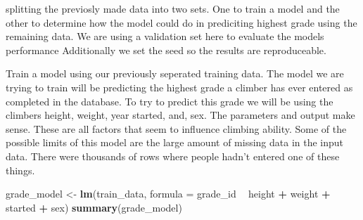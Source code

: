 \documentclass[]{article}
\newenvironment{Shaded}{\begin{snugshade}}{\end{snugshade}}
\newcommand{\CommentTok}[1]{\textcolor[rgb]{0.56,0.35,0.01}{\textit{#1}}}
\newcommand{\DataTypeTok}[1]{\textcolor[rgb]{0.13,0.29,0.53}{#1}}
\newcommand{\DecValTok}[1]{\textcolor[rgb]{0.00,0.00,0.81}{#1}}
\newcommand{\KeywordTok}[1]{\textcolor[rgb]{0.13,0.29,0.53}{\textbf{#1}}}
\newcommand{\NormalTok}[1]{#1}
\newcommand{\OperatorTok}[1]{\textcolor[rgb]{0.81,0.36,0.00}{\textbf{#1}}}
\newcommand{\StringTok}[1]{\textcolor[rgb]{0.31,0.60,0.02}{#1}}
\begin{document}
splitting the previosly made data into two sets. One to train a model
and the other to determine how the model could do in prediciting highest
grade using the remaining data. We are using a validation set here to
evaluate the models performance Additionally we set the seed so the
results are reproduceable.

\begin{Shaded}
\end{Shaded}

Train a model using our previously seperated training data. The model we
are trying to train will be predicting the highest grade a climber has
ever entered as completed in the database. To try to predict this grade
we will be using the climbers height, weight, year started, and, sex.
The parameters and output make sense. These are all factors that seem to
influence climbing ability. Some of the possible limits of this model
are the large amount of missing data in the input data. There were
thousands of rows where people hadn't entered one of these things.

\begin{Shaded}
\begin{Highlighting}[]
\NormalTok{grade_model <-}\StringTok{ }\KeywordTok{lm}\NormalTok{(train_data, }\DataTypeTok{formula =}\NormalTok{ grade_id }\OperatorTok{~}\StringTok{ }\NormalTok{height }\OperatorTok{+}\StringTok{ }\NormalTok{weight }\OperatorTok{+}\StringTok{ }\NormalTok{started }\OperatorTok{+}\StringTok{ }\NormalTok{sex)}
\KeywordTok{summary}\NormalTok{(grade_model)}
\end{Highlighting}
\end{Shaded}
\end{document}
